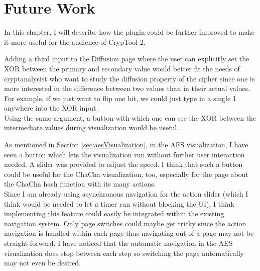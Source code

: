 \chapter{Future Work}
\label{chap:futureWork}

In this chapter, I will describe how the plugin could be further improved to make it more useful for the audience of CrypTool 2.

\begin{description}[style=nextline]
\item[Diffusion: XOR input and button to toggle between XOR and actual values] 

Adding a third input to the Diffusion page where the user can explicitly set the XOR between the primary and secondary value would better fit the needs of cryptanalysist who want to study the diffusion property of the cipher since one is more interested in the difference between two values than in their actual values. For example, if we just want to flip one bit, we could just type in a single 1 anywhere into the XOR input. \\
Using the same argument, a button with which one can see the XOR between the intermediate values during visualization would be useful.

\item[Automatic navigation]

As mentioned in Section \ref{sec:aesVisualization}, in the AES visualization, I have seen a button which lets the visualization run without further user interaction needed. A slider was provided to adjust the speed. I think that such a button could be useful for the ChaCha visualization, too, especially for the page about the ChaCha hash function with its many actions. \\
Since I am already using asynchronous navigation for the action slider (which I think would be needed to let a timer run without blocking the UI), I think implementing this feature could easily be integrated within the existing navigation system. Only page switches could maybe get tricky since the action navigation is handled within each page thus navigating out of a page may not be straight-forward. I have noticed that the automatic navigation in the AES visualization does stop between each step so switching the page automatically may not even be desired.

\item[Salsa20 visualization]


\end{description}
